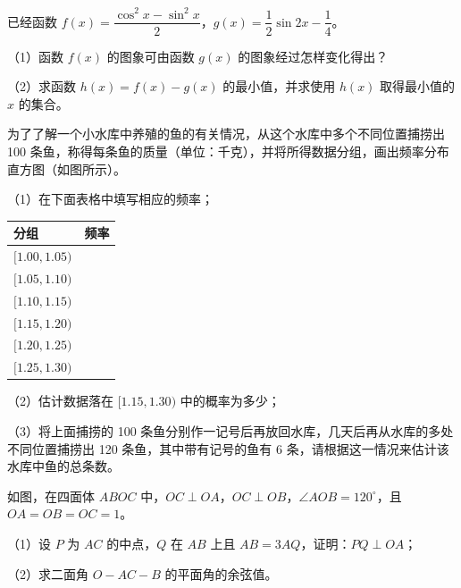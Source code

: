\begin{question}
已经函数 $f(x)=\dfrac{\cos^2x-\sin^2x}{2}$，$g(x)=\dfrac12\sin2x-\dfrac14$。

（1）函数 $f(x)$ 的图象可由函数 $g(x)$ 的图象经过怎样变化得出？

（2）求函数 $h(x)=f(x)-g(x)$ 的最小值，并求使用 $h(x)$ 取得最小值的 $x$ 的集合。

\Needspace{0.4\textheight}
\end{question}
\begingroup
\renewenvironment{question}{\Needspace{0.5\textheight}}{}
\begin{question}
为了了解一个小水库中养殖的鱼的有关情况，从这个水库中多个不同位置捕捞出 100 条鱼，称得每条鱼的质量（单位：千克），并将所得数据分组，画出频率分布直方图（如图所示）。
\nopagebreak[4]
\begin{center}\end{center}
\nopagebreak[4]
（1）在下面表格中填写相应的频率；

\begin{center}
\begin{tabular}{ll}
\toprule
分组 & 频率 \\
\midrule
$[1.00,1.05)$ &  \\
$[1.05,1.10)$ &  \\
$[1.10,1.15)$ &  \\
$[1.15,1.20)$ &  \\
$[1.20,1.25)$ &  \\
$[1.25,1.30)$ &  \\
\bottomrule
\end{tabular}
\end{center}

（2）估计数据落在 $[1.15,1.30)$ 中的概率为多少；

（3）将上面捕捞的 100 条鱼分别作一记号后再放回水库，几天后再从水库的多处不同位置捕捞出 120 条鱼，其中带有记号的鱼有 6 条，请根据这一情况来估计该水库中鱼的总条数。

\Needspace{0.4\textheight}
\end{question}
\endgroup
\begingroup
\renewenvironment{question}{\Needspace{0.5\textheight}}{}
\begin{question}
如图，在四面体 $ABOC$ 中，$OC\perp OA$，$OC\perp OB$，$\angle AOB=120^\circ$，且 $OA=OB=OC=1$。

（1）设 $P$ 为 $AC$ 的中点，$Q$ 在 $AB$ 上且 $AB=3AQ$，证明：$PQ\perp OA$；

（2）求二面角 $O-AC-B$ 的平面角的余弦值。
\nopagebreak[4]
\begin{center}\end{center}
\nopagebreak[4]
\end{question}
